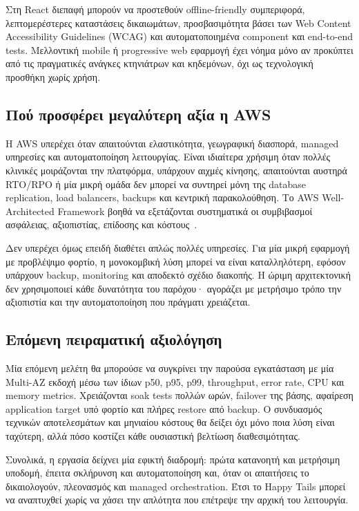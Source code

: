 Στη React διεπαφή μπορούν να προστεθούν offline-friendly συμπεριφορά,
λεπτομερέστερες καταστάσεις δικαιωμάτων, προσβασιμότητα βάσει των Web Content
Accessibility Guidelines (WCAG) και
αυτοματοποιημένα component και end-to-end tests. Μελλοντική mobile ή
progressive web εφαρμογή έχει νόημα μόνο αν προκύπτει από τις πραγματικές
ανάγκες κτηνιάτρων και κηδεμόνων, όχι ως τεχνολογική προσθήκη χωρίς χρήση.

\subsection{Πού προσφέρει μεγαλύτερη αξία η AWS}
Η AWS υπερέχει όταν απαιτούνται ελαστικότητα, γεωγραφική διασπορά, managed
υπηρεσίες και αυτοματοποίηση λειτουργίας. Είναι ιδιαίτερα χρήσιμη όταν πολλές
κλινικές μοιράζονται την πλατφόρμα, υπάρχουν αιχμές κίνησης, απαιτούνται
αυστηρά RTO/RPO ή μία μικρή ομάδα δεν μπορεί να συντηρεί μόνη της database
replication, load balancers, backups και κεντρική παρακολούθηση. Το AWS
Well-Architected Framework βοηθά να εξετάζονται συστηματικά οι συμβιβασμοί
ασφάλειας, αξιοπιστίας, επίδοσης και κόστους~\cite{aws2024wellarchitected}.

Δεν υπερέχει όμως επειδή διαθέτει απλώς πολλές υπηρεσίες. Για μία μικρή
εφαρμογή με προβλέψιμο φορτίο, η μονοκομβική λύση μπορεί να είναι
καταλληλότερη, εφόσον υπάρχουν backup, monitoring και αποδεκτό σχέδιο
διακοπής. Η ώριμη αρχιτεκτονική δεν χρησιμοποιεί κάθε δυνατότητα του
παρόχου· αγοράζει με μετρήσιμο τρόπο την αξιοπιστία και την αυτοματοποίηση
που πράγματι χρειάζεται.

\subsection{Επόμενη πειραματική αξιολόγηση}
Μία επόμενη μελέτη θα μπορούσε να συγκρίνει την παρούσα εγκατάσταση με μία
Multi-AZ εκδοχή μέσω των ίδιων p50, p95, p99, throughput, error rate, CPU και
memory metrics. Χρειάζονται soak tests πολλών ωρών, failover της βάσης,
αφαίρεση application target υπό φορτίο και πλήρες restore από backup. Ο
συνδυασμός τεχνικών αποτελεσμάτων και μηνιαίου κόστους θα δείξει όχι μόνο
ποια λύση είναι ταχύτερη, αλλά πόσο κοστίζει κάθε ουσιαστική βελτίωση
διαθεσιμότητας.

Συνολικά, η εργασία δείχνει μία εφικτή διαδρομή: πρώτα κατανοητή και
μετρήσιμη υποδομή, έπειτα σκλήρυνση και αυτοματοποίηση και, όταν οι απαιτήσεις
το δικαιολογούν, πλεονασμός και managed orchestration. Έτσι το Happy Tails
μπορεί να αναπτυχθεί χωρίς να χάσει την απλότητα που επέτρεψε την αρχική του
λειτουργία.
